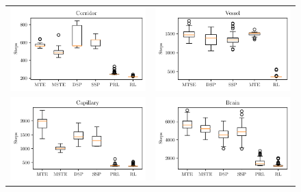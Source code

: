 \begin{figure}[ht]
    \begin{center}
        \begin{tabular}{cc}
            \includegraphics[clip, width=0.45\columnwidth]{figures/evaluation/baseline/plot_map0318_MostDistancedPairFinderAlgorithm.pdf} &
            \includegraphics[clip, width=0.45\columnwidth]{figures/evaluation/baseline/plot_vessel_MostDistancedPairFinderAlgorithm.pdf} \\
            \includegraphics[clip, width=0.45\columnwidth]{figures/evaluation/baseline/plot_map0518_MostDistancedPairFinderAlgorithm.pdf} &
            \includegraphics[clip, width=0.45\columnwidth]{figures/evaluation/baseline/plot_map0122_RandomPairFinderAlgorithm.pdf} \\
        \end{tabular}


\end{center}
\end{figure}
